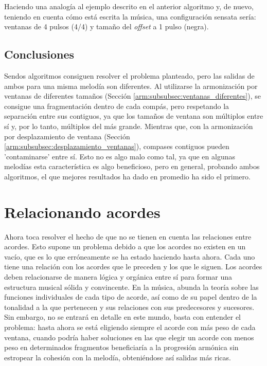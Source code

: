 Haciendo una analogía al ejemplo descrito en el anterior algoritmo y, de nuevo, teniendo en cuenta cómo está escrita la música, una configuración sensata sería: ventanas de 4 pulsos (4/4) y tamaño del \textit{offset} a 1 pulso (negra).

\subsection{Conclusiones}
    
Sendos algoritmos consiguen resolver el problema planteado, pero las salidas de ambos para una misma melodía son diferentes. Al utilizarse la armonización por ventanas de diferentes tamaños (Sección \ref{arm:subsubsec:ventanas_diferentes}), se consigue una fragmentación dentro de cada compás, pero respetando la separación entre sus contiguos, ya que los tamaños de ventana son múltiplos entre sí y, por lo tanto, múltiplos del más grande. Mientras que, con la armonización por desplazamiento de ventana (Sección \ref{arm:subsubsec:desplazamiento_ventanas}), compases contiguos pueden 'contaminarse' entre sí. Esto no es algo malo como tal, ya que en algunas melodías esta característica es algo beneficioso, pero en general, probando ambos algoritmos, el que mejores resultados ha dado en promedio ha sido el primero.

\section{Relacionando acordes}

Ahora toca resolver el hecho de que no se tienen en cuenta las relaciones entre acordes. Esto supone un problema debido a que los acordes no existen en un vacío, que es lo que erróneamente se ha estado haciendo hasta ahora. Cada uno tiene una relación con los acordes que le preceden y los que le siguen. Los acordes deben relacionarse de manera lógica y orgánica entre sí para formar una estructura musical sólida y convincente. En la música, abunda la teoría sobre las funciones individuales de cada tipo de acorde, así como de su papel dentro de la tonalidad a la que pertenecen y sus relaciones con sus predecesores y sucesores. Sin embargo, no se entrará en detalle en este mundo, basta con entender el problema: hasta ahora se está eligiendo siempre el acorde con más peso de cada ventana, cuando podría haber soluciones en las que elegir un acorde con menos peso en determinados fragmentos beneficiaría a la progresión armónica sin estropear la cohesión con la melodía, obteniéndose así salidas más ricas.


